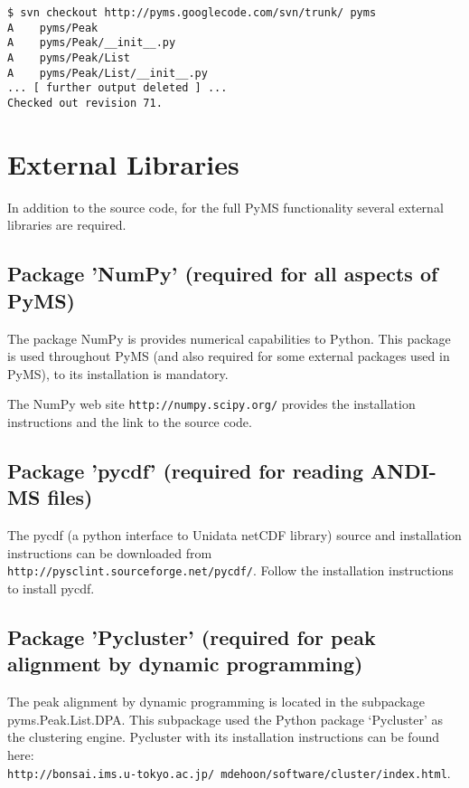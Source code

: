 \begin{verbatim}
$ svn checkout http://pyms.googlecode.com/svn/trunk/ pyms
A    pyms/Peak
A    pyms/Peak/__init__.py
A    pyms/Peak/List
A    pyms/Peak/List/__init__.py
... [ further output deleted ] ...
Checked out revision 71.
\end{verbatim}

\section{\label{sec:external-libraries}External Libraries}

In addition to the source code, for the full PyMS functionality
several external libraries are required.

\subsection{\label{subsec:numpy}Package 'NumPy' (required for all
aspects of PyMS)}

The package NumPy is provides numerical capabilities to Python. This
package is used throughout PyMS (and also required for some external
packages used in PyMS), to its installation is mandatory.

The NumPy web site {\tt http://numpy.scipy.org/} provides the installation
instructions and the link to the source code.

\subsection{\label{subsec:pycdf}Package 'pycdf' (required for reading
ANDI-MS files)}

The pycdf (a python interface to Unidata netCDF library) source and
installation instructions can be downloaded from\\
{\tt http://pysclint.sourceforge.net/pycdf/}. Follow the installation
instructions to install pycdf.

\subsection{\label{subsec:pycluster}Package 'Pycluster' (required for peak
alignment by dynamic programming)}

The peak alignment by dynamic programming is located in the subpackage
pyms.Peak.List.DPA. This subpackage used the Python package `Pycluster'
as the clustering engine. Pycluster with its installation instructions
can be found here:\\
{\tt http://bonsai.ims.u-tokyo.ac.jp/~mdehoon/software/cluster/index.html}.

